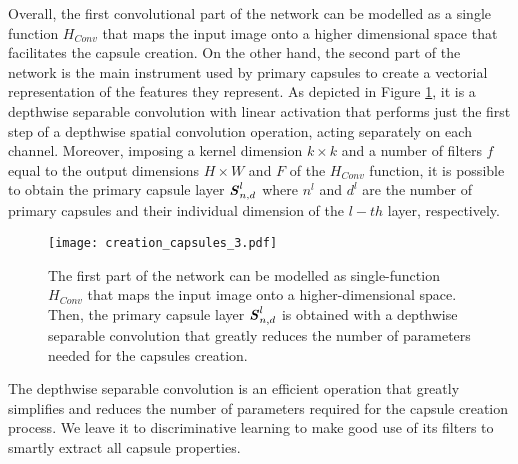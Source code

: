 \documentclass{article}
\begin{document}
Overall, the first convolutional part of the network can be modelled as a single function $H_{Conv}$ that maps the input image onto a higher dimensional space that facilitates the capsule creation. On the other hand, the second part of the network is the main instrument used by primary capsules to create a vectorial representation of the features they represent. As depicted in Figure \ref{fig:creation_capsules}, it is a depthwise separable convolution with linear activation that performs just the first step of a depthwise spatial convolution operation, acting separately on each channel. Moreover, imposing a kernel dimension $k \times k$ and a number of filters $f$ equal to the output dimensions $H \times W$ and $F$ of the $H_{Conv}$ function, it is possible to obtain the primary capsule layer 
$\textbf{\textit{S}}^{l}_{n,d}$ where $n^l$ and $d^l$ are the number of primary capsules and their individual dimension of the $l-th$ layer, respectively.
\begin{figure}
    \centering
    \texttt{[image: creation\_capsules\_3.pdf]}
    \caption{The first part of the network can be modelled as single-function $H_{Conv}$ that maps the input image onto a higher-dimensional space. Then, the primary capsule layer $\textbf{\textit{S}}^{l}_{n,d}$ is obtained with a depthwise separable convolution that greatly reduces the number of parameters needed for the capsules creation.}
    \label{fig:creation_capsules}
\end{figure}
The depthwise separable convolution is an efficient operation that greatly simplifies and reduces the number of parameters required for the capsule creation process. We leave it to discriminative learning to make good use of its filters to smartly extract all capsule properties.
\end{document}
